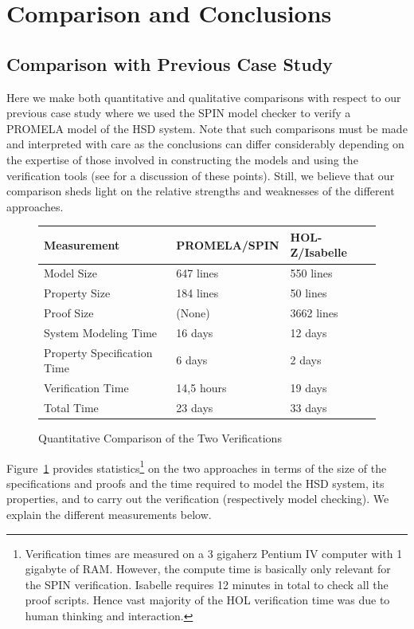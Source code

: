 \documentclass[a4paper,pdftex]{article}
\begin{document}



\section{Comparison and Conclusions} \label{conclusions-sec}
\subsection{Comparison with Previous Case Study}

Here we make both quantitative and qualitative comparisons with respect
to our previous case study where we used the SPIN model checker to verify a 
PROMELA model of the HSD system.  Note that such comparisons must be made and
interpreted with care as the conclusions can
differ considerably depending on the expertise of those involved in
constructing the models and using the verification tools (see \cite{Basin90b}
for a discussion of these points).   Still, we believe that
our comparison sheds light on the relative strengths
and weaknesses of the different approaches.

\begin{figure}[t]
\begin{center}
\begin{tabular}{|lll|} \hline
   Measurement & PROMELA/SPIN & HOL-Z/Isabelle \\\hline
Model Size  & 647  lines & 550 lines\\
Property Size  & 184 lines &  50 lines\\
Proof Size & (None) & 3662 lines\\
System Modeling Time  & 16 days &  12 days \\
Property Specification Time  & 6 days &  2 days \\
Verification Time & 14,5 hours &  19 days\\
Total Time & 23 days & 33 days\\
\hline
\end{tabular}
\end{center}
\caption{Quantitative Comparison of the Two Verifications\label{quant-comparison}}
\end{figure}

Figure~\ref{quant-comparison} provides statistics\footnote{Verification
times are measured on a 3 gigaherz Pentium IV computer with 1 gigabyte
of RAM.  However, the compute time is basically only relevant for the
SPIN verification.  Isabelle requires 12 minutes in total to check all
the proof scripts.  Hence vast majority of the HOL verification time was
due to human thinking and interaction.} on the two approaches in terms
of the size of the specifications and proofs and the time required to
model the HSD system, its properties, and to carry out the verification
(respectively model checking).  We explain the different measurements
below.
\end{document}
